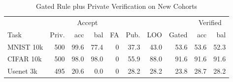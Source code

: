 \begin{table}[t]
\caption{Gated Rule plus Private Verification on New Cohorts}
\label{tab:verify-teacher}\small\setlength{\tabcolsep}{2.2pt}
\centering
\begin{tabular}{@{}lrrrrrrrrr@{}}\toprule
 & & \multicolumn{2}{c}{Accept} & & & & & \multicolumn{2}{c}{Verified} \\
Task & Priv. & acc & bal & FA & Pub. & LOO & Gated & acc & bal \\
\midrule
MNIST 10k & 500 & 99.6 & 77.4 & 0 & 37.3 & 43.0 & 53.6 & 53.6 & 52.3 \\
CIFAR 10k & 500 & 98.0 & 98.0 & 0 & 55.9 & 88.0 & 91.6 & 91.6 & 91.6 \\
Usenet 3k & 495 & 20.6 & 0.0 & 0 & 28.2 & 28.2 & 23.8 & 28.7 & 28.2 \\
\bottomrule\end{tabular}
\end{table}
